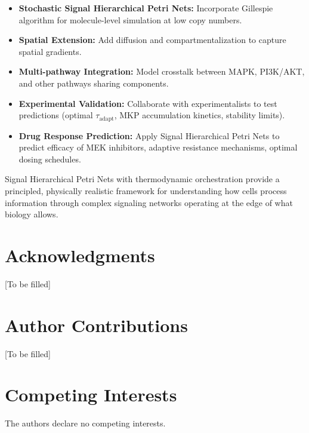 \documentclass[twocolumn,11pt]{article}
\newcommand{\shpns}{Signal Hierarchical Petri Nets}
\newcommand{\mkp}{MKP}
\newcommand{\mapk}{MAPK}
\begin{document}
\begin{itemize}
\item \textbf{Stochastic \shpns{}:} Incorporate Gillespie algorithm for molecule-level simulation at low copy numbers.
\item \textbf{Spatial Extension:} Add diffusion and compartmentalization to capture spatial gradients.
\item \textbf{Multi-pathway Integration:} Model crosstalk between \mapk{}, PI3K/AKT, and other pathways sharing components.
\item \textbf{Experimental Validation:} Collaborate with experimentalists to test predictions (optimal $\tau_{\text{adapt}}$, \mkp{} accumulation kinetics, stability limits).
\item \textbf{Drug Response Prediction:} Apply \shpns{} to predict efficacy of MEK inhibitors, adaptive resistance mechanisms, optimal dosing schedules.
\end{itemize}

Signal Hierarchical Petri Nets with thermodynamic orchestration provide a principled, physically realistic framework for understanding how cells process information through complex signaling networks operating at the edge of what biology allows.

\section*{Acknowledgments}

[To be filled]

\section*{Author Contributions}

[To be filled]

\section*{Competing Interests}

The authors declare no competing interests.
\end{document}

